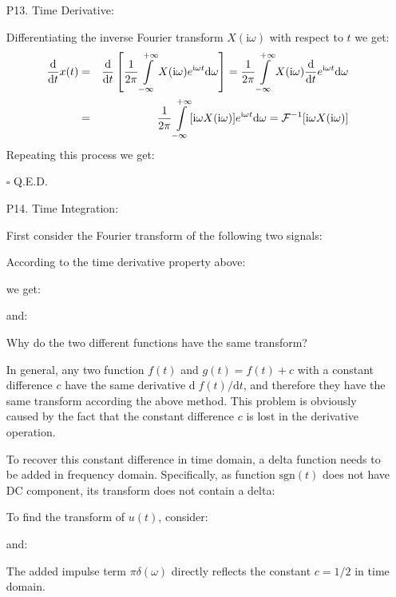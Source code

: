 \begin{itemize}
	\item[P13.]  Time Derivative:
	
	\begin{dem} Differentiating the inverse Fourier transform $X(\mathrm{i}\omega)$ with
	respect to $t$ we get:
	\begin{eqnarray}
	\frac{\mathrm{d}}{\mathrm{d}t} x(t) &=&\frac{\mathrm{d}}{\mathrm{d}t} \left[\frac{1}{2\pi}
		\int\limits_{-\infty}^{+\infty} X(\mathrm{i}\omega)e^{\mathrm{i}\omega t} \mathrm{d}\omega\right]
	= \frac{1}{2\pi}\int\limits_{-\infty}^{+\infty} X(\mathrm{i}\omega) \frac{\mathrm{d}}{\mathrm{d}t}e^{\mathrm{i}\omega t} \mathrm{d}\omega
		\nonumber \\
	&=& \frac{1}{2\pi}\int\limits_{-\infty}^{+\infty} [\mathrm{i}\omega X(\mathrm{i}\omega)] e^{\mathrm{i}\omega t} \mathrm{d}\omega 
	= {\cal F}^{-1} [\mathrm{i}\omega X(\mathrm{i}\omega)]
		\nonumber
	\end{eqnarray}
	Repeating this process we get:
	
	\begin{flushright}
		$\square$  Q.E.D.
	\end{flushright}
	\end{dem}
	
	\item[P14.] Time Integration:
	
	First consider the Fourier transform of the following two signals:
	
	
	According to the time derivative property above:
	
	we get:
	
	and:
	
	Why do the two different functions have the same transform?
	
	In general, any two function $f(t)$ and $g(t)=f(t)+c$ with a constant difference $c$ have the same derivative $\mathrm{d}\;f(t)/\mathrm{d}t$, and therefore they have the same transform according the above method. This problem is obviously caused by the fact that the constant difference $c$ is lost in the derivative operation.
	
	To recover this constant difference in time domain, a delta function 
	needs to be added in frequency domain. Specifically, as function $\mathrm{sgn}(t)$ does not have DC component, its transform does not contain a delta:
	
	To find the transform of $u(t)$, consider:
	
	and:
	
	The added impulse term $\pi \delta(\omega)$ directly reflects the constant $c=1/2$ in time domain.
	

\end{itemize}
